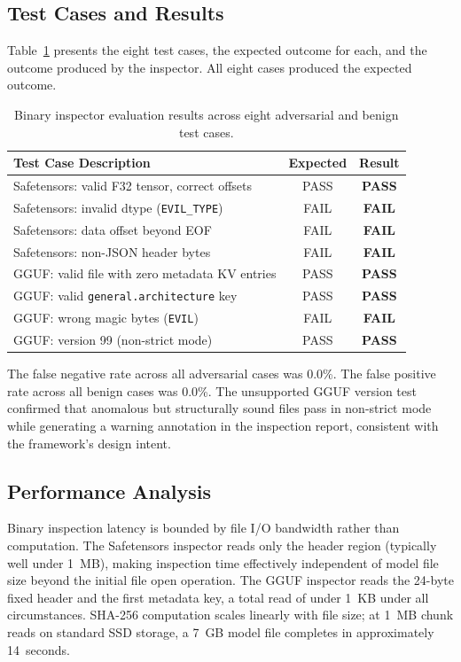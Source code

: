 \documentclass[preprint,12pt,twocolumn]{elsarticle}
\begin{document}
\subsection{Test Cases and Results}

Table~\ref{tab:results} presents the eight test cases, the expected outcome
for each, and the outcome produced by the inspector. All eight cases
produced the expected outcome.

\begin{table}[ht]
\caption{Binary inspector evaluation results across eight adversarial and
  benign test cases.}
\label{tab:results}
\renewcommand{\arraystretch}{1.2}
\begin{tabularx}{\columnwidth}{Xcc}
\toprule
\textbf{Test Case Description} & \textbf{Expected} & \textbf{Result} \\
\midrule
Safetensors: valid F32 tensor, correct offsets   & PASS & \textbf{PASS} \\
Safetensors: invalid dtype (\texttt{EVIL\_TYPE}) & FAIL & \textbf{FAIL} \\
Safetensors: data offset beyond EOF              & FAIL & \textbf{FAIL} \\
Safetensors: non-JSON header bytes               & FAIL & \textbf{FAIL} \\
GGUF: valid file with zero metadata KV entries   & PASS & \textbf{PASS} \\
GGUF: valid \texttt{general.architecture} key    & PASS & \textbf{PASS} \\
GGUF: wrong magic bytes (\texttt{EVIL})          & FAIL & \textbf{FAIL} \\
GGUF: version 99 (non-strict mode)              & PASS & \textbf{PASS} \\
\bottomrule
\end{tabularx}
\end{table}

The false negative rate across all adversarial cases was 0.0\%. The false
positive rate across all benign cases was 0.0\%. The unsupported GGUF
version test confirmed that anomalous but structurally sound files pass
in non-strict mode while generating a warning annotation in the inspection
report, consistent with the framework's design intent.

\subsection{Performance Analysis}

Binary inspection latency is bounded by file I/O bandwidth rather than
computation. The Safetensors inspector reads only the header region
(typically well under 1~MB), making inspection time effectively independent
of model file size beyond the initial file open operation. The GGUF
inspector reads the 24-byte fixed header and the first metadata key, a
total read of under 1~KB under all circumstances. SHA-256 computation
scales linearly with file size; at 1~MB chunk reads on standard SSD
storage, a 7~GB model file completes in approximately 14~seconds.
\end{document}

